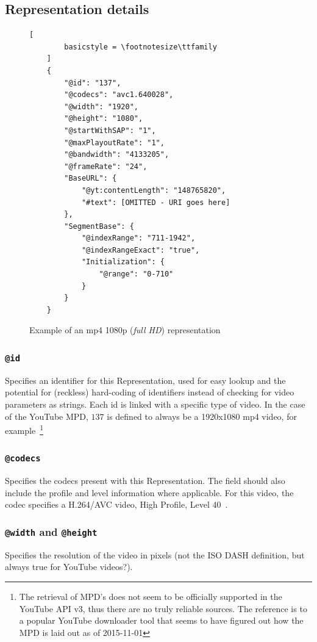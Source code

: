 \subsection{Representation details}

\begin{figure}
    \centering
    \begin{lstlisting}[
        basicstyle = \footnotesize\ttfamily
    ]
    {
        "@id": "137",
        "@codecs": "avc1.640028",
        "@width": "1920",
        "@height": "1080",
        "@startWithSAP": "1",
        "@maxPlayoutRate": "1",
        "@bandwidth": "4133205",
        "@frameRate": "24",
        "BaseURL": {
            "@yt:contentLength": "148765820",
            "#text": [OMITTED - URI goes here]
        },
        "SegmentBase": {
            "@indexRange": "711-1942",
            "@indexRangeExact": "true",
            "Initialization": {
                "@range": "0-710"
            }
        }
    }
    \end{lstlisting}
    \caption{Example of an mp4 1080p (\textit{full HD}) representation}
    \label{fig:dash-1080p-representation}
\end{figure}

\subsubsection{\texttt{@id}}
Specifies an identifier for this Representation, used for easy lookup and the
potential for (reckless) hard-coding of identifiers instead of checking for
video parameters as strings.
Each id is linked with a specific type of video. In the case of the
YouTube MPD, $137$ is defined to always be a 1920x1080 mp4 video, for
example~\cite[line 303]{youtube-dl:youtube.py}\footnote{The retrieval of MPD's
does not seem to be officially supported in the YouTube API v3, thus there are
no truly reliable sources. The reference is to a popular YouTube downloader tool
that seems to have figured out how the MPD is laid out as of 2015-11-01}

\subsubsection{\texttt{@codecs}}
Specifies the codecs present with this
Representation. The field should also include the profile and level
information where applicable. For this video, the codec specifies a
H.264/AVC video, High Profile, Level 40~\cite[p. 12]{rfc6381}.

\subsubsection{\texttt{@width} and \texttt{@height}}
Specifies the resolution of the video in pixels (not the ISO DASH definition, but always true for YouTube
videos?).

